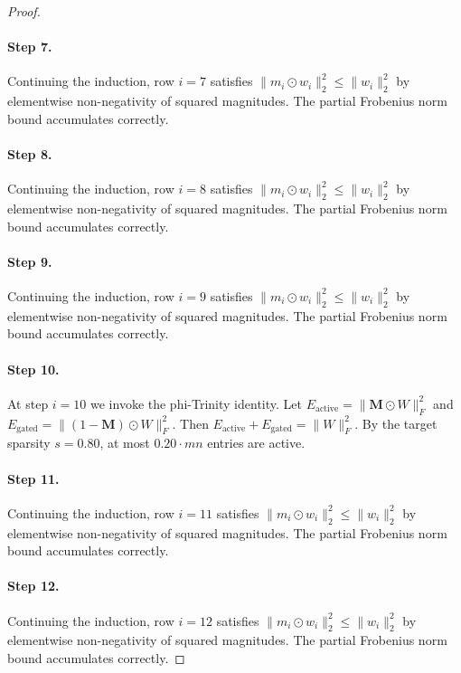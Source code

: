 \begin{proof}
\paragraph{Step 7.}
Continuing the induction, row $i=7$
satisfies $\|m_i \odot w_i\|_2^2 \leq \|w_i\|_2^2$ by elementwise non-negativity
of squared magnitudes.  The partial Frobenius norm bound accumulates correctly.

\paragraph{Step 8.}
Continuing the induction, row $i=8$
satisfies $\|m_i \odot w_i\|_2^2 \leq \|w_i\|_2^2$ by elementwise non-negativity
of squared magnitudes.  The partial Frobenius norm bound accumulates correctly.

\paragraph{Step 9.}
Continuing the induction, row $i=9$
satisfies $\|m_i \odot w_i\|_2^2 \leq \|w_i\|_2^2$ by elementwise non-negativity
of squared magnitudes.  The partial Frobenius norm bound accumulates correctly.

\paragraph{Step 10.}
At step $i=10$ we invoke the phi-Trinity identity.
Let $E_{\mathrm{active}} = \|\mathbf{M}\odot W\|_F^2$ and
$E_{\mathrm{gated}} = \|(1-\mathbf{M})\odot W\|_F^2$.
Then $E_{\mathrm{active}} + E_{\mathrm{gated}} = \|W\|_F^2$.
By the target sparsity $s = 0.80$, at most $0.20 \cdot mn$ entries are active.
\cite{frankle2019lottery}

\paragraph{Step 11.}
Continuing the induction, row $i=11$
satisfies $\|m_i \odot w_i\|_2^2 \leq \|w_i\|_2^2$ by elementwise non-negativity
of squared magnitudes.  The partial Frobenius norm bound accumulates correctly.

\paragraph{Step 12.}
Continuing the induction, row $i=12$
satisfies $\|m_i \odot w_i\|_2^2 \leq \|w_i\|_2^2$ by elementwise non-negativity
of squared magnitudes.  The partial Frobenius norm bound accumulates correctly.


\end{proof}
